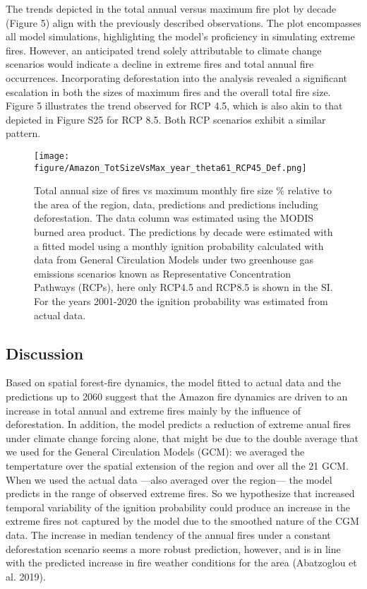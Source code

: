 \documentclass[
]{article}
\begin{document}
The trends depicted in the total annual versus maximum fire plot by
decade (Figure 5) align with the previously described observations. The
plot encompasses all model simulations, highlighting the model's
proficiency in simulating extreme fires. However, an anticipated trend
solely attributable to climate change scenarios would indicate a decline
in extreme fires and total annual fire occurrences. Incorporating
deforestation into the analysis revealed a significant escalation in
both the sizes of maximum fires and the overall total fire size. Figure
5 illustrates the trend observed for RCP 4.5, which is also akin to that
depicted in Figure S25 for RCP 8.5. Both RCP scenarios exhibit a similar
pattern.

\begin{figure}
\centering
\texttt{[image: figure/Amazon\_TotSizeVsMax\_year\_theta61\_RCP45\_Def.png]}
\caption{Total annual size of fires vs maximum monthly fire size \%
relative to the area of the region, data, predictions and predictions
including deforestation. The data column was estimated using the MODIS
burned area product. The predictions by decade were estimated with a
fitted model using a monthly ignition probability calculated with data
from General Circulation Models under two greenhouse gas emissions
scenarios known as Representative Concentration Pathways (RCPs), here
only RCP4.5 and RCP8.5 is shown in the SI. For the years 2001-2020 the
ignition probability was estimated from actual data.}
\end{figure}

\subsection{Discussion}\label{discussion}

Based on spatial forest-fire dynamics, the model fitted to actual data
and the predictions up to 2060 suggest that the Amazon fire dynamics are
driven to an increase in total annual and extreme fires mainly by the
influence of deforestation. In addition, the model predicts a reduction
of extreme anual fires under climate change forcing alone, that might be
due to the double average that we used for the General Circulation
Models (GCM): we averaged the tempertature over the spatial extension of
the region and over all the 21 GCM. When we used the actual data ---also
averaged over the region--- the model predicts in the range of observed
extreme fires. So we hypothesize that increased temporal variability of
the ignition probability could produce an increase in the extreme fires
not captured by the model due to the smoothed nature of the CGM data.
The increase in median tendency of the annual fires under a constant
deforestation scenario seems a more robust prediction, however, and is
in line with the predicted increase in fire weather conditions for the
area (Abatzoglou et al. 2019).
\end{document}
